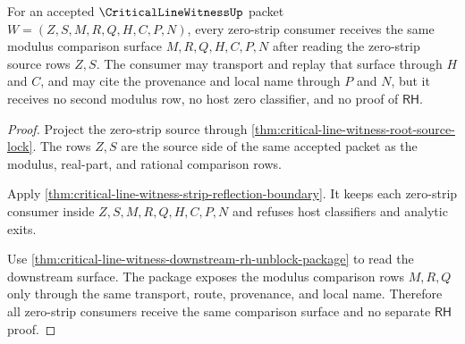 \begin{theorem}
\label{thm:critical-line-witness-downstream-zero-strip-exactness}
For an accepted $\CriticalLineWitnessUp$ packet $W=(Z,S,M,R,Q,H,C,P,N)$, every zero-strip consumer receives the same modulus comparison surface $M,R,Q,H,C,P,N$ after reading the zero-strip source rows $Z,S$. The consumer may transport and replay that surface through $H$ and $C$, and may cite the provenance and local name through $P$ and $N$, but it receives no second modulus row, no host zero classifier, and no proof of $\mathsf{RH}$.
\end{theorem}
\begin{proof}
Project the zero-strip source through \autoref{thm:critical-line-witness-root-source-lock}. The rows $Z,S$ are the source side of the same accepted packet as the modulus, real-part, and rational comparison rows.

Apply \autoref{thm:critical-line-witness-strip-reflection-boundary}. It keeps each zero-strip consumer inside $Z,S,M,R,Q,H,C,P,N$ and refuses host classifiers and analytic exits.

Use \autoref{thm:critical-line-witness-downstream-rh-unblock-package} to read the downstream surface. The package exposes the modulus comparison rows $M,R,Q$ only through the same transport, route, provenance, and local name. Therefore all zero-strip consumers receive the same comparison surface and no separate $\mathsf{RH}$ proof.
\end{proof}

